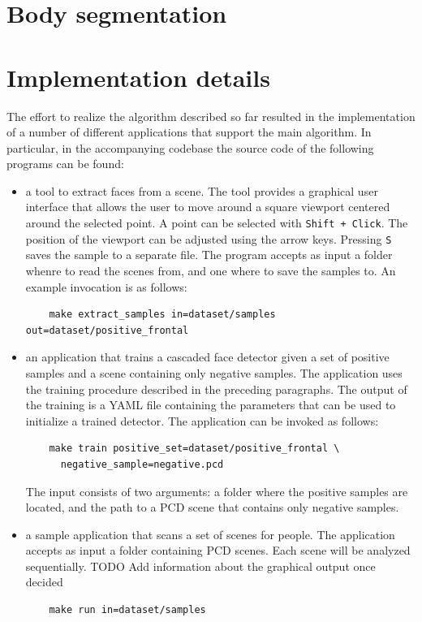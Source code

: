 \documentclass[a4paper,11pt,titlepage]{article}
\begin{document}
\section{Body segmentation}

\section{Implementation details}
The effort to realize the algorithm described so far resulted in the
implementation of a number of different applications that support the main
algorithm. In particular, in the accompanying codebase the source code of the
following programs can be found:

\begin{itemize}
  \item a tool to extract faces from a scene. The tool provides a graphical user
    interface that allows the user to move around a square viewport centered
    around the selected point. A point can be selected with \texttt{Shift +
    Click}. The position of the viewport can be adjusted using the arrow keys.
    Pressing \texttt{S} saves the sample to a separate file. The program accepts
    as input a folder whenre to read the scenes from, and one where to save the
    samples to. An example invocation is as follows:

    \begin{verbatim}
    make extract_samples in=dataset/samples out=dataset/positive_frontal
    \end{verbatim}

  \item an application that trains a cascaded face detector given a set of
    positive samples and a scene containing only negative samples. The
    application uses the training procedure described in the preceding
    paragraphs. The output of the training is a YAML file containing the
    parameters that can be used to initialize a trained detector. The
    application can be invoked as follows:

    \begin{verbatim}
    make train positive_set=dataset/positive_frontal \
      negative_sample=negative.pcd
    \end{verbatim}

    The input consists of two arguments: a folder where the positive samples are
    located, and the path to a PCD scene that contains only negative samples.

  \item a sample application that scans a set of scenes for people. The
    application accepts as input a folder containing PCD scenes. Each scene will
    be analyzed sequentially.
    TODO Add information about the graphical output once decided

    \begin{verbatim}
    make run in=dataset/samples
    \end{verbatim}
\end{itemize}
\end{document}
